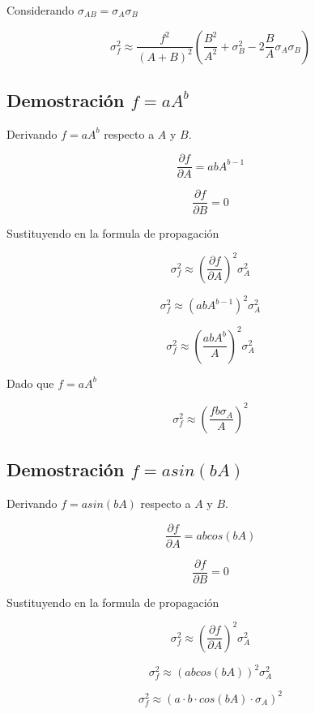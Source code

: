 \documentclass[a4paper,12pt]{article} %
\begin{document}
		Considerando $\sigma_{AB} = \sigma_A\sigma_B$
		
		\[
		\sigma_f^2 \approx \frac{f^2}{(A+B)^2} \left( \frac{B^2}{A^2}  +  \sigma_B^2 - 2 \frac{B}{A} \sigma_A \sigma_B \right)
		\]
		
		\subsection{Demostraci\'on $f = aA^{b}$}
		
		Derivando $f = aA^{b}$ respecto a $A$ y $B$.
		
		\[
		\frac{\partial f}{\partial A} =  a b A^{b-1}
		\]
		
		\[
		\frac{\partial f}{\partial B} = 0
		\]
		
		Sustituyendo en la formula de propagaci\'on 
		
		\[
		\sigma_f^2 \approx \left( \frac{\partial f}{\partial A}  \right)^2 \sigma_A^2
		\]
		
		\[
		\sigma_f^2 \approx \left( a b A^{b-1} \right)^2 \sigma_A^2
		\]
		
		\[
		\sigma_f^2 \approx \left(\frac{a b A^{b}}{A}  \right)^2 \sigma_A^2
		\]
		
		Dado que $f = aA^{b}$ 
		
		
		
		\[
		\sigma_f^2 \approx \left( \frac{f b \sigma_A}{A} \right)^2
		\]
		
		
		\subsection{Demostraci\'on $f = a sin(bA)$	}
		
		Derivando $f = a sin(bA)$ respecto a $A$ y $B$.
		
		\[
		\frac{\partial f}{\partial A} =  a b cos(bA)
		\]
		
		\[
		\frac{\partial f}{\partial B} = 0
		\]
		
		Sustituyendo en la formula de propagaci\'on 
		
		\[
		\sigma_f^2 \approx \left( \frac{\partial f}{\partial A}  \right)^2 \sigma_A^2
		\]
		
		\[
		\sigma_f^2 \approx \left( a b cos(bA) \right)^2 \sigma_A^2
		\]
		
		\[
		\sigma_f^2 \approx \left(a \cdot b \cdot cos(bA) \cdot \sigma_A  \right)^2 
		\]
		

		

	
\end{document}
